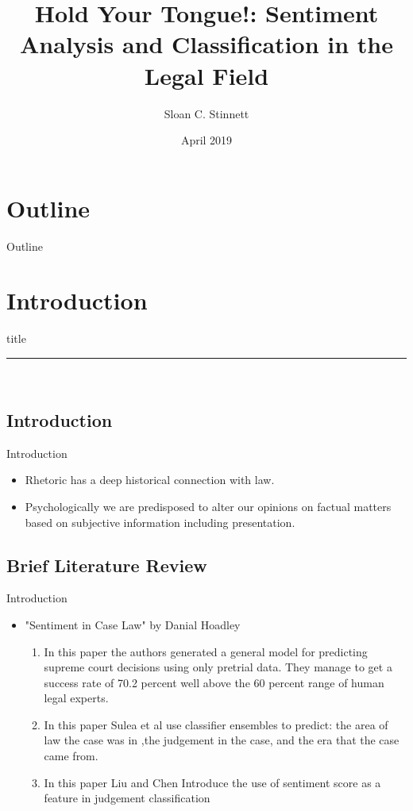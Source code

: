 \documentclass{beamer}
\title{Hold Your Tongue!: Sentiment Analysis and Classification in the Legal Field}
\author{Sloan C. Stinnett}
\institute{University of Oklahome}
\date{April 2019} %
\begin{document}
{ 
\frame{\titlepage}}

\section*{Outline}\begin{frame}{Outline}\tableofcontents\end{frame}

\section{Introduction}
    \begin{frame}[plain]
        \vfill
      \centering
      \begin{beamercolorbox}[sep=8pt,center,shadow=true,rounded=true]{title}
        \insertsectionhead\par%
        \color{oxfordblue}\noindent\rule{10cm}{1pt} \\
      \end{beamercolorbox}
      \vfill
  \end{frame}
  
\subsection{Introduction}
\begin{frame}{Introduction}
\begin{itemize}
    \item  Rhetoric has a deep historical connection with law.
    \item Psychologically we are predisposed to alter our opinions on factual matters based on subjective information including presentation.
\end{itemize}
\end{frame}

\subsection{Brief Literature Review}
\begin{frame}{Introduction}
\begin{itemize}
    \item "Sentiment in Case Law" \cite{noauthor_sentiment_nodate}  by Danial Hoadley
    \begin{enumerate}
         \item \cite{katz_general_2017} In this paper the authors generated a general model for predicting supreme court decisions using only pretrial data. They manage to get a success rate of 70.2 percent well above the 60 percent range of human legal experts.
        \item \cite{sulea_exploring_2017} In this paper Sulea et al use classifier ensembles to predict: the area of law the case was in ,the judgement in the case, and the era that the case came from. 
        \item \cite{liu_two-phase_2018} In this paper Liu and Chen Introduce the use of sentiment score as a feature in judgement classification
    \end{enumerate}
\end{itemize}
\end{frame}
\end{document}
